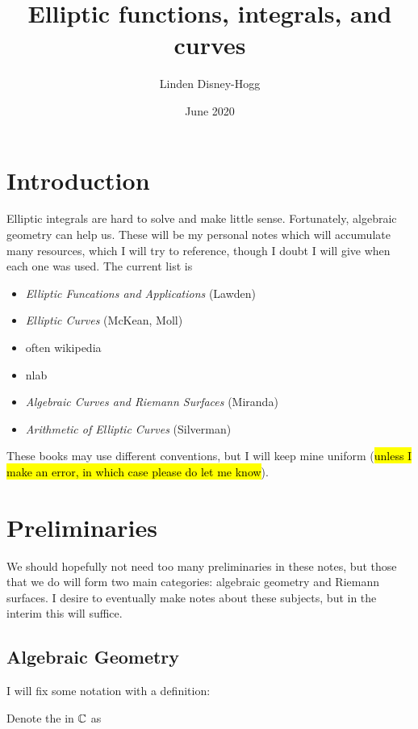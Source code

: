 \documentclass{article}
\title{Elliptic functions, integrals, and curves}
\author{Linden Disney-Hogg}
\date{June 2020}
\begin{document}
\maketitle
\tableofcontents

\section{Introduction}
Elliptic integrals are hard to solve and make little sense. Fortunately, algebraic geometry can help us. These will be my personal notes which will accumulate many resources, which I will try to reference, though I doubt I will give when each one was used. The current list is 
\begin{itemize}
	\item \textit{Elliptic Funcations and Applications} (Lawden)
	\item \textit{Elliptic Curves} (McKean, Moll) 
	\item often wikipedia
	\item nlab
	\item \textit{Algebraic Curves and Riemann Surfaces} (Miranda)
	\item \textit{Arithmetic of Elliptic Curves} (Silverman)
\end{itemize}
These books may use different conventions, but I will keep mine uniform (\hl{unless I make an error, in which case please do let me know}). 

\section{Preliminaries}
We should hopefully not need too many preliminaries in these notes, but those that we do will form two main categories: algebraic geometry and Riemann surfaces. I desire to eventually make notes about these subjects, but in the interim this will suffice. 

\subsection{Algebraic Geometry}

I will fix some notation with a definition:

\begin{definition}
	Denote the  in $\mathbb{C}$ as 
\end{definition}
\end{document}
